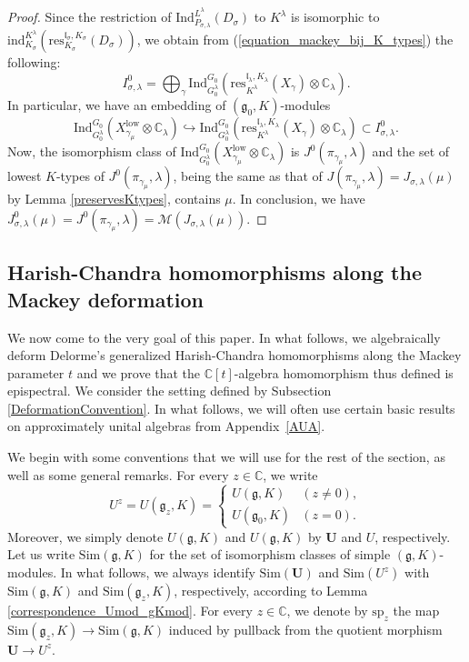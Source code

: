 \documentclass{amsart}
\theoremstyle{definition}
\begin{document}
\begin{proof}
    Since the restriction of $\mathrm{Ind}^{L^\lambda}_{P_{\sigma,\lambda}}(D_{\sigma})$ to $K^\lambda$ is isomorphic to $\mathrm{ind}^{K^\lambda}_{K_\sigma}(\mathrm{res}_{K_\sigma}^{\mathfrak{l}_\sigma,K_\sigma}(D_\sigma))$, we obtain from (\ref{equation_mackey_bij_K_types}) the following:
    \[I^0_{\sigma,\lambda} =\bigoplus_\gamma\mathrm{Ind}_{G_0^\lambda}^{G_0}\!\left(\mathrm{res}_{K^\lambda}^{\mathfrak{l}_\lambda,K_\lambda}(X_\gamma) \otimes \mathbb{C}_\lambda \right).\]
     In particular, we have an embedding of $(\mathfrak{g}_0,K)$-modules
     \[\mathrm{Ind}_{G_0^\lambda}^{G_0}(X^\mathrm{low}_{\gamma_\mu} \otimes\mathbb{C}_\lambda) \hookrightarrow \mathrm{Ind}_{G_0^\lambda}^{G_0}\!\left(\mathrm{res}_{K^\lambda}^{\mathfrak{l}_\lambda,K_\lambda}(X_\gamma) \otimes \mathbb{C}_\lambda\right) \subset I^0_{\sigma,\lambda}.\]
     Now, the isomorphism class of $\mathrm{Ind}_{G_0^\lambda}^{G_0}(X^\mathrm{low}_{\gamma_\mu} \otimes\mathbb{C}_\lambda)$ is $J^0(\pi_{\gamma_\mu},\lambda)$ and the set of lowest $K$-types of $J^0(\pi_{\gamma_\mu},\lambda)$, being the same as that of $J(\pi_{\gamma_\mu},\lambda) = J_{\sigma,\lambda}(\mu)$ by Lemma \ref{preservesKtypes}, contains $\mu$. In conclusion, we have $J^0_{\sigma,\lambda}(\mu) = J^0(\pi_{\gamma_\mu},\lambda) = \mathcal{M}(J_{\sigma,\lambda}(\mu))$.
\end{proof}

\subsection{Harish-Chandra homomorphisms along the Mackey deformation}\label{HC_homomorphisms}

We now come to the very goal of this paper. In what follows, we algebraically deform Delorme's generalized Harish-Chandra homomorphisms \cite{Delorme84} along the Mackey parameter $t$ and we prove that the $\mathbb{C}[t]$-algebra homomorphism thus defined is epispectral. We consider the setting defined by Subsection \ref{DeformationConvention}. In what follows, we will often use certain basic results on approximately unital algebras from Appendix~\ref{AUA}.

We begin with some conventions that we will use for the rest of the section, as well as some general remarks. For every $z \in \mathbb{C}$, we write
    \[U^z = U(\bm{\mathfrak{g}}_z, K) = \begin{cases}
        U(\mathfrak{g},K) & (z \neq 0),\\
        U(\mathfrak{g}_0,K) & (z = 0).
    \end{cases}\]
Moreover, we simply denote $U(\bm{\mathfrak{g}},K)$ and $U(\mathfrak{g},K)$ by $\bm{U}$ and $U$, respectively. Let us write $\mathrm{Sim}(\bm{\mathfrak{g}},K)$ for the set of isomorphism classes of simple $(\bm{\mathfrak{g}},K)$-modules. In what follows, we always identify $\mathrm{Sim}(\bm{U})$ and $\mathrm{Sim}(U^z)$ with $\mathrm{Sim}(\bm{\mathfrak{g}},K)$ and $\mathrm{Sim}(\bm{\mathfrak{g}}_z,K)$, respectively, according to Lemma \ref{correspondence_Umod_gKmod}. For every $z \in \mathbb{C}$, we denote by $\mathrm{sp}_z$ the map $\mathrm{Sim}(\bm{\mathfrak{g}}_z,K) \to \mathrm{Sim}(\bm{\mathfrak{g}},K)$ induced by pullback from the quotient morphism $\bm{U} \to U^z$.
\end{document}
